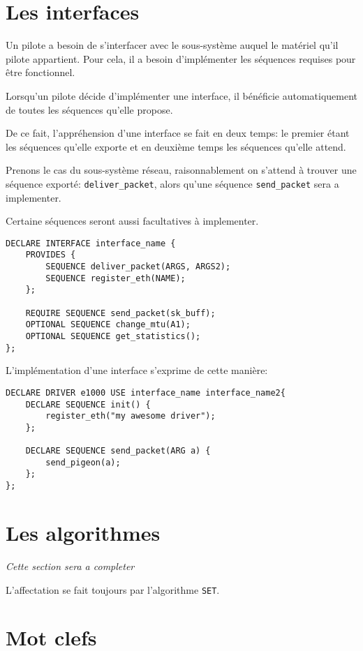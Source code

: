 \documentclass{rtxreport}
\begin{document}
\section{Les interfaces}

Un pilote a besoin de s'interfacer avec le sous-système auquel le matériel qu'il pilote appartient.
Pour cela, il a besoin d'implémenter les séquences requises pour être fonctionnel.

Lorsqu'un pilote décide d'implémenter une interface, il bénéficie automatiquement de toutes
les séquences qu'elle propose.

De ce fait, l'appréhension d'une interface se fait en deux temps: le premier étant les séquences
qu'elle exporte et en deuxième temps les séquences qu'elle attend.


Prenons le cas du sous-système réseau, raisonnablement on s'attend à trouver une séquence exporté:
\texttt{deliver\_packet}, alors qu'une séquence \texttt{send\_packet} sera a implementer.

Certaine séquences seront aussi facultatives à implementer.

\begin{lstlisting}[caption=Exemple de declaration d'une interface]
DECLARE INTERFACE interface_name {
	PROVIDES {
		SEQUENCE deliver_packet(ARGS, ARGS2);
		SEQUENCE register_eth(NAME);
	};

	REQUIRE SEQUENCE send_packet(sk_buff);
	OPTIONAL SEQUENCE change_mtu(A1);
	OPTIONAL SEQUENCE get_statistics();
};
\end{lstlisting}

L'implémentation d'une interface s'exprime de cette manière:

\begin{lstlisting}[caption=Utilisation d'une interface]
DECLARE DRIVER e1000 USE interface_name interface_name2{
	DECLARE SEQUENCE init() {
		register_eth("my awesome driver");
	};

	DECLARE SEQUENCE send_packet(ARG a) {
		send_pigeon(a);
	};
};
\end{lstlisting}


\section{Les algorithmes}
\emph{Cette section sera a completer}

L'affectation se fait toujours par l'algorithme \texttt{SET}.

\section{Mot clefs}
\end{document}
